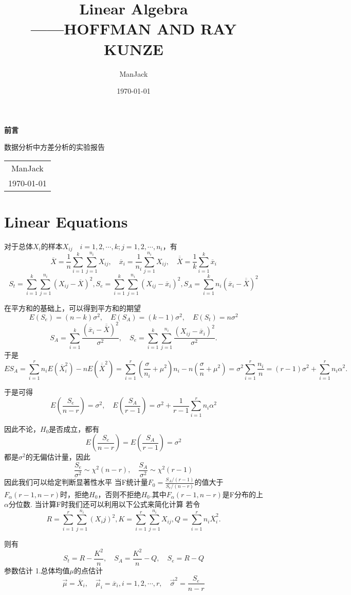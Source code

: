 \documentclass[11pt, a4paper, oneside, UTF8]{ctexbook}
\title{{\Huge{\textbf{Linear Algebra}}}\\------HOFFMAN AND RAY KUNZE}
\author{ManJack}
\date{\today}
\newtheorem[M]{theorem}{Theorem}[section]
\newtheorem[M]{lemma}[theorem]{Lemma}
\newtheorem[M]{definition}{Definition}[section]
\begin{document}
\maketitle

\setcounter{page}{1}

\newpage
\begin{center}
  \Huge\textbf{前言}
\end{center}

数据分析中方差分析的实验报告
\begin{flushright}
  \begin{tabular}{c}
    ManJack \\
    \today
  \end{tabular}
\end{flushright}

\newpage
\tableofcontents
\newpage
{}
\setcounter{page}{1}

\chapter{Linear Equations}

对于总体$X_i$的样本$X_{ij} \quad i = 1,2,\cdots,k;j = 1,2,\cdots,n_i$，有\[
\overline{X} = \frac{1}{n}\sum_{i=1}^k\sum_{j=1}^{n_i}X_{ij}, \quad \overline{x}_i = \frac{1}{n_i}\sum_{j=1}^{n_i}X_{ij}, \quad \overline{\overline{X}} = \frac{1}{k}\sum_{i=1}^k\overline{x}_i\]
\[
 S_t = \sum_{i=1}^k\sum_{j=1}^{n_i}(X_{ij} - \overline{X})^2,S_e = \sum_{i=1}^k\sum_{j=1}^{n_i}(X_{ij} - \overline{x}_i)^2,S_A = \sum_{i=1}^k n_i(\overline{x}_i - \overline{\overline{X}})^2
\]

在平方和的基础上，可以得到平方和的期望\[
  E(S_e) = (n-k)\sigma^2, \quad E(S_A) = (k-1)\sigma^2, \quad E(S_t) = n\sigma^2
\]
\[
  S_A = \sum_{i=1}^k\frac{(\overline{x}_i - \overline{\overline{X}})^2}{\sigma^2}, \quad S_e = \sum_{i=1}^k\sum_{j=1}^{n_i}\frac{(X_{ij} - \overline{x}_i)^2}{\sigma^2}
.\]
于是\[
  ES_A = \sum\limits_{i=1}^{r}n_iE(\overline{X}_i^2) - nE(\overline{\overline{X}}^2) = \sum\limits_{i=1}^{r}(\frac{\sigma}{n_i}+\mu^2)n_i - n(\frac{\sigma}{n}+\mu^2) = \sigma^2\sum\limits_{i=1}^{r}\frac{n_i}{n} = (r-1)\sigma^2 +\sum\limits_{i=1}^{r}n_i\alpha^2
.\]

于是可得
\[
  E(\frac{S_e}{n-r})= \sigma^2, \quad E(\frac{S_A}{r-1}) = \sigma^2 + \frac{1}{r-1}\sum\limits_{i=1}^{r}n_i\alpha^2
\]

因此不论，$H_0$是否成立，都有\[
  E(\frac{S_e}{n-r}) = E(\frac{S_A}{r-1}) = \sigma^2
\]都是$\sigma^2$的无偏估计量，因此\[
  \frac{S_e}{\sigma^2} \sim \chi^2(n-r), \quad \frac{S_A}{\sigma^2} \sim \chi^2(r-1)
\]
因此我们可以给定判断显著性水平
当F统计量$F_0 = \frac{S_A/(r-1)}{S_e/(n-r)}$的值大于$F_{\alpha}(r-1,n-r)$时，拒绝$H_0$，否则不拒绝$H_0$.其中$F_{\alpha}(r-1,n-r)$是F分布的上$\alpha$分位数.
当计算F时我们还可以利用以下公式来简化计算
若令
\[
R = \sum\limits_{i=1}^{r}\sum\limits_{j=1}^{n_i}(X_ij)^2,K = \sum\limits_{i=1}^{r}\sum\limits_{j=1}^{n_i}X_{ij},Q = \sum\limits_{i=1}^{r}n_i\overline{X}_i^2
.\]

则有\[
  S_t = R - \frac{K^2}{n}, \quad S_A = \frac{K^2}{n} - Q, \quad S_e = R - Q
\]
参数估计
1.总体均值$\mu$的点估计
\[
 \vec{\mu} = \overline{X}_i, \quad \vec{\mu}_i = \overbar{x}_i,i = 1,2,\cdots,r,\quad \vec{\sigma}^2 = \frac{S_e}{n-r}
\]
\end{document}

